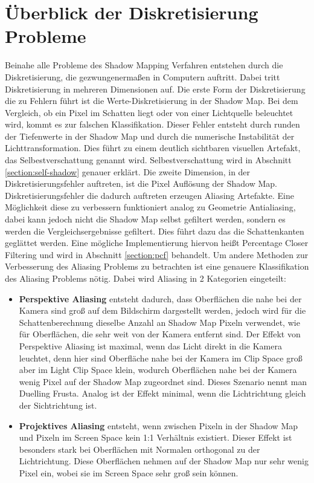 \section{Überblick der Diskretisierung Probleme}
\label{section:problem-overview}
Beinahe alle Probleme des Shadow Mapping Verfahren entstehen durch die Diskretisierung,
die gezwungenermaßen in Computern auftritt. 
Dabei tritt Diskretisierung in mehreren Dimensionen auf.
\newline \newline
Die erste Form der Diskretisierung die zu Fehlern führt ist die Werte-Diskretisierung 
in der Shadow Map. 
Bei dem Vergleich, ob ein Pixel im Schatten liegt oder von einer Lichtquelle beleuchtet wird,
kommt es zur falschen Klassifikation. Dieser Fehler entsteht durch runden der Tiefenwerte in der Shadow Map und
durch die numerische Instabilität der Lichttransformation.
Dies führt zu einem deutlich sichtbaren visuellen Artefakt, das Selbestverschattung genannt wird.
Selbestverschattung wird in Abschnitt \ref{section:self-shadow} genauer erklärt.
\newline \newline
Die zweite Dimension, in der Diskretisierungsfehler auftreten, ist die Pixel Auflösung der Shadow Map.
Diskretisierungsfehler die dadurch auftreten erzeugen Aliasing Artefakte.
Eine Möglichkeit diese zu verbessern funktioniert analog zu Geometrie Antialiasing, dabei kann jedoch
nicht die Shadow Map selbst gefiltert werden, sondern es werden die Vergleichsergebnisse gefiltert.
Dies führt dazu das die Schattenkanten geglättet werden. 
Eine mögliche Implementierung hiervon heißt Percentage Closer Filtering
und wird in Abschnitt \ref{section:pcf} behandelt.
\newline
\newline
Um andere Methoden zur Verbesserung des Aliasing Problems zu betrachten ist eine genauere Klassifikation des Aliasing Problems 
nötig. 
Dabei wird Aliasing in 2 Kategorien eingeteilt:
\begin{itemize}
  \item \textbf{Perspektive Aliasing} entsteht dadurch, dass Oberflächen die nahe bei der Kamera sind groß auf dem 
    Bildschirm dargestellt werden, jedoch wird für die Schattenberechnung dieselbe Anzahl an Shadow Map Pixeln verwendet,
    wie für Oberflächen, die sehr weit von der Kamera entfernt sind. 
    Der Effekt von Perspektive Aliasing ist maximal, wenn das Licht direkt in die Kamera leuchtet, denn hier 
    sind Oberfläche nahe bei der Kamera im Clip Space groß aber im Light Clip Space klein, 
    wodurch Oberflächen nahe bei der Kamera wenig Pixel auf der Shadow Map zugeordnet sind. 
    Dieses Szenario nennt man Duelling Frusta. 
    Analog ist der Effekt minimal, wenn die Lichtrichtung gleich der Sichtrichtung ist.
  \item \textbf{Projektives Aliasing} entsteht, wenn zwischen Pixeln in der Shadow Map und Pixeln 
    im Screen Space kein 1:1 Verhältnis existiert. Dieser Effekt ist besonders stark bei Oberflächen
    mit Normalen orthogonal zu der Lichtrichtung. Diese Oberflächen nehmen auf der Shadow Map nur sehr wenig 
    Pixel ein, wobei sie im Screen Space sehr groß sein können. 
\end{itemize}

